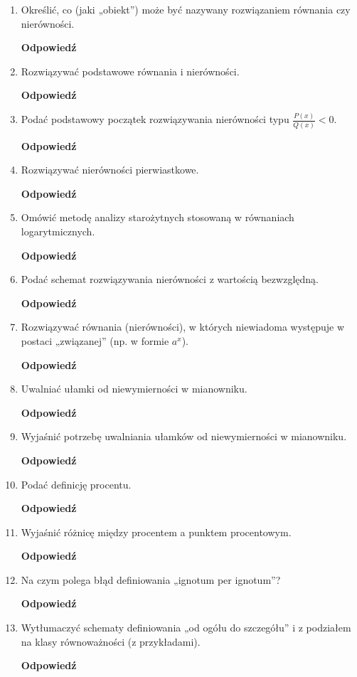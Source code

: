 \documentclass[12pt,a4paper]{article}
\theoremstyle{break}
\newcommand{\Odp}[1]{
		\begin{mdframed}[style=zadanie]
			\textbf{Odpowiedź}\\
			#1
		\end{mdframed}
	}
\begin{document}
\begin{enumerate}[1.]
{	}
	
	\item Określić, co (jaki „obiekt”) może być nazywany rozwiązaniem równania czy nierówności.
	\Odp{
	
	}

	\item Rozwiązywać podstawowe równania i nierówności.
	\Odp{
	
	}
	
	\item Podać podstawowy początek rozwiązywania nierówności typu $\frac{P(x)}{Q(x)} < 0$.
	\Odp{
	
	}
	
	\item Rozwiązywać nierówności pierwiastkowe.
	\Odp{
	
	}
	
	\item Omówić metodę analizy starożytnych stosowaną w równaniach logarytmicznych.
	\Odp{
	
	}
	
	\item Podać schemat rozwiązywania nierówności z wartością bezwzględną.
	\Odp{
	
	}

	\item Rozwiązywać równania (nierówności), w których niewiadoma występuje w postaci	„związanej” (np. w formie $a^x$).
	\Odp{
	
	}
	
	\item Uwalniać ułamki od niewymierności w mianowniku.
	\Odp{
	
	}
	
	\item Wyjaśnić potrzebę uwalniania ułamków od niewymierności w mianowniku.
	\Odp{
	
	}
	
	\item Podać definicję procentu.
	\Odp{
	
	}
	
	\item Wyjaśnić różnicę między procentem a punktem procentowym.
	\Odp{
	
	}
	
	\item Na czym polega błąd definiowania „ignotum per ignotum”?
	\Odp{
	
	}
	
	\item Wytłumaczyć schematy definiowania „od ogółu do szczegółu” i z podziałem na klasy
	równoważności (z przykładami).
	\Odp{
	
}
\end{enumerate}
\end{document}
